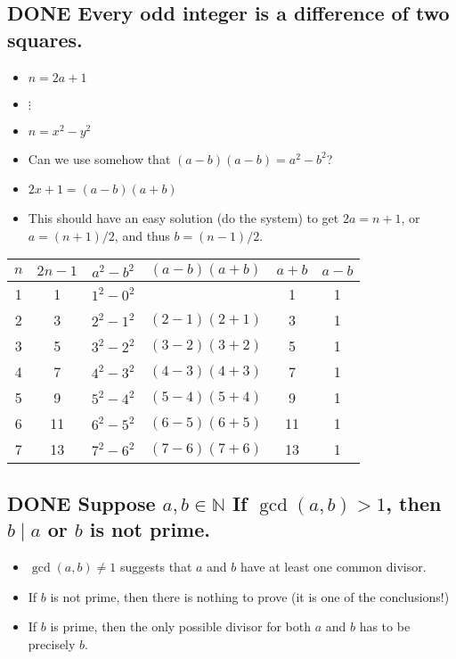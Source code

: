 \documentclass[11pt, oneside]{amsart}
\begin{document}
\subsection{{\bfseries\sffamily DONE} Every odd integer is a difference of two squares.}
\label{sec:org9075cd3}
\begin{itemize}
\item \(n = 2a+1\)
\item \(\vdots\)
\item \(n = x^2 - y^2\)
\item Can we use somehow that \((a-b)(a-b)=a^2-b^2\)?
\item \(2x+1 = (a-b)(a+b)\)
\item This should have an easy solution (do the system) to get \(2a = n + 1\), or \(a=(n+1)/2\), and thus \(b=(n-1)/2\).
\end{itemize}
\begin{center}
\begin{tabular}{|c|c|c|c|c|c|}
\hline
\(n\) & \(2n-1\) & \(a^2-b^2\) & \((a-b)(a+b)\) & \(a+b\) & \(a-b\)\\
\hline
1 & 1 & \(1^2 - 0^2\) &  & 1 & 1\\
2 & 3 & \(2^2 - 1^2\) & \((2-1)(2+1)\) & 3 & 1\\
3 & 5 & \(3^2 - 2^2\) & \((3-2)(3+2)\) & 5 & 1\\
4 & 7 & \(4^2 - 3^2\) & \((4-3)(4+3)\) & 7 & 1\\
5 & 9 & \(5^2 - 4^2\) & \((5-4)(5+4)\) & 9 & 1\\
6 & 11 & \(6^2 - 5^2\) & \((6-5)(6+5)\) & 11 & 1\\
7 & 13 & \(7^2 - 6^2\) & \((7-6)(7+6)\) & 13 & 1\\
\hline
\end{tabular}
\end{center}

\subsection{{\bfseries\sffamily DONE} Suppose \(a, b \in \mathbb{N}\) If \(\gcd(a,b)>1\), then \(b \mid a\) or \(b\) is not prime.}
\label{sec:orgbded85b}
\begin{itemize}
\item \(\gcd(a,b) \neq 1\) suggests that \(a\) and \(b\) have at least one common divisor.
\item If \(b\) is not prime, then there is nothing to prove (it is one of the conclusions!)
\item If \(b\) is prime, then the only possible divisor for both \(a\) and \(b\) has to be precisely \(b\).
\end{itemize}
\end{document}
